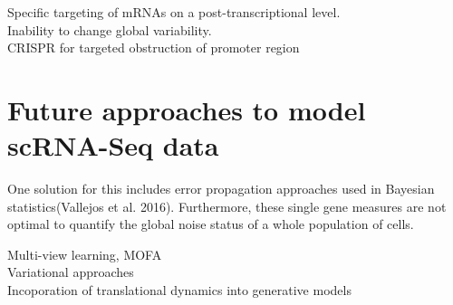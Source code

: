 Specific targeting of mRNAs on a post-transcriptional level.\\

Inability to change global variability. \\

CRISPR for targeted obstruction of promoter region


\section{Future approaches to model scRNA-Seq data}

One solution for this includes error propagation approaches used in Bayesian statistics(Vallejos et al. 2016). Furthermore, these single gene measures are not optimal to quantify the global noise status of a whole population of cells.

Multi-view learning, MOFA\\
Variational approaches\\
Incoporation of translational dynamics into generative models

